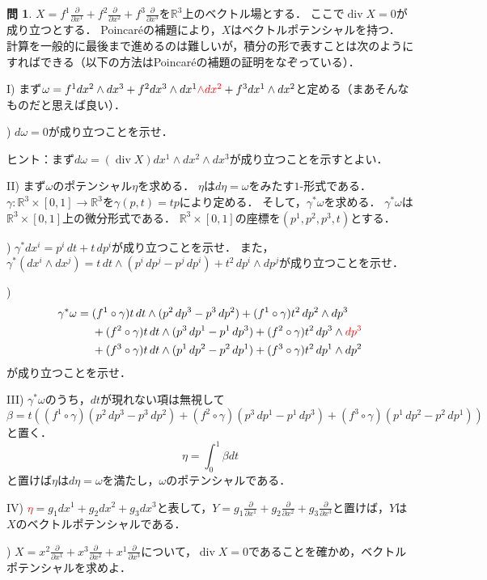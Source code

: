 \documentclass[dvipdfmx,nosetpagesize, uplatex]{jsarticle}
\DeclareMathOperator{\Div}{\mathrm{div}}
\newcommand\R{\mathbb{R}}
\theoremstyle{definition}
\newtheorem*{question*}{問}
\theoremstyle{StatementsWithStar}
\theoremstyle{StatementsWithStar2}
\theoremstyle{StatementsWithStar3}
\theoremstyle{StatementsWithCCirc}
\theoremstyle{definition}
\begin{document}
\begin{question*}
$X=f^1\frac{\partial}{\partial x^1}+f^2\frac{\partial}{\partial x^2}+f^3\frac{\partial}{\partial x^3}$を$\mathbb{R}^3$上のベクトル場とする．
ここで$\Div X=0$が成り立つとする．
Poincar\'eの補題により，$X$はベクトルポテンシャルを持つ．
計算を一般的に最後まで進めるのは難しいが，積分の形で表すことは次のようにすればできる（以下の方法はPoincar\'eの補題の証明をなぞっている）．\par\noindent
I) まず$\omega=f^1dx^2\wedge dx^3+f^2dx^3\wedge dx^1\textcolor{red}{\wedge dx^2}+f^3dx^1\wedge dx^2$と定める（まあそんなものだと思えば良い）．\par{}) $d\omega=0$が成り立つことを示せ．\par\noindent
ヒント：まず$d\omega=(\Div X)dx^1\wedge dx^2\wedge dx^3$が成り立つことを示すとよい．\par
\noindent
II) まず$\omega$のポテンシャル$\eta$を求める．
$\eta$は$d\eta=\omega$をみたす$1$-形式である．
$\gamma\colon\R^3\times[0,1]\to\R^3$を$\gamma(p,t)=tp$により定める．
そして，$\gamma^*\omega$を求める．
$\gamma^*\omega$は$\R^3\times[0,1]$上の微分形式である．
$\R^3\times[0,1]$の座標を$(p^1,p^2,p^3,t)$とする．
\par{}) $\gamma^*dx^i=p^i\,dt+t\,dp^i$が成り立つことを示せ．
また，$\gamma^*(dx^i\wedge dx^j)=t\,dt\wedge(p^i\,dp^j-p^j\,dp^i)+t^2\,dp^i\wedge dp^j$が成り立つことを示せ．\par{})
\begin{align*}
\gamma^*\omega&=(f^1\circ\gamma)t\,dt\wedge(p^2\,dp^3-p^3\,dp^2)+(f^1\circ\gamma)t^2\,dp^2\wedge dp^3\\*
&\hphantom{{}={}}+(f^2\circ\gamma)t\,dt\wedge(p^3\,dp^1-p^1\,dp^3)+(f^2\circ\gamma)t^2\,dp^3\wedge \textcolor{red}{dp^3}\\*
&\hphantom{{}={}}+(f^3\circ\gamma)t\,dt\wedge(p^1\,dp^2-p^2\,dp^1)+(f^3\circ\gamma)t^2\,dp^1\wedge dp^2
\end{align*}
が成り立つことを示せ．\par\noindent
III) $\gamma^*\omega$のうち，$dt$が現れない項は無視して
\[
\beta=t((f^1\circ\gamma)(p^2\,dp^3-p^3\,dp^2)+(f^2\circ\gamma)(p^3\,dp^1-p^1\,dp^3)+(f^3\circ\gamma)(p^1\,dp^2-p^2\,dp^1))
\]
と置く．
\[
\eta=\int_0^1\beta dt
\]
と置けば$\eta$は$d\eta=\omega$を満たし，$\omega$のポテンシャルである．\par\noindent
IV) \textcolor{red}{$\eta$}$=g_1dx^1+g_2dx^2+g_3dx^3$と表して，$Y=g_1\frac{\partial}{\partial x^1}+g_2\frac{\partial}{\partial x^2}+g_3\frac{\partial}{\partial x^3}$と置けば，$Y$は$X$のベクトルポテンシャルである．\par{}) $X=x^2\frac{\partial}{\partial x^1}+x^3\frac{\partial}{\partial x^2}+x^1\frac{\partial}{\partial x^3}$について，$\Div X=0$であることを確かめ，ベクトルポテンシャルを求めよ．
\end{question*}
\end{document}
